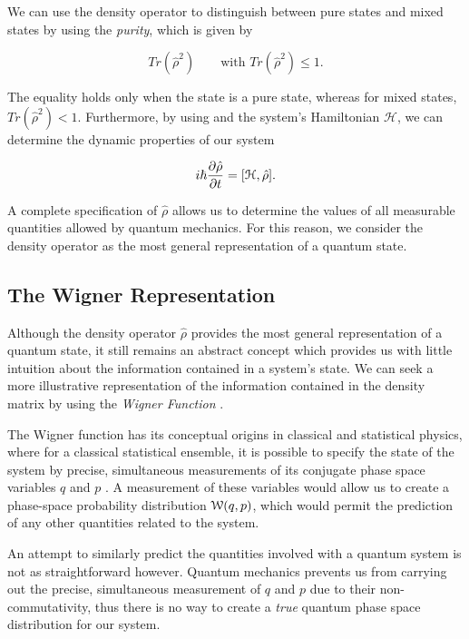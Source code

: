 \noindent
We can use the density operator to distinguish between pure states and mixed states by using the \emph{purity}, which is given by \cite{gerry2005introductory} 

\begin{equation}
  \label{eq:purity_density}
  Tr(\hat{\rho}^2) \quad \quad \text{with } Tr(\hat{\rho}^2) \le 1. 
\end{equation} 

\noindent
The equality holds only when the state is a pure state, whereas for mixed
states, $Tr(\hat{\rho}^2) < 1$.  Furthermore, by using  and the system's Hamiltonian $\mathcal{H}$, we can determine the dynamic properties of our system 

\begin{equation}
  \label{eq:von_neumann}
  i \hbar \frac{\partial \hat{\rho}}{\partial t} = [\mathcal{H}, \hat{\rho}].
\end{equation}

\noindent
A complete specification of $\hat{\rho}$ allows us to determine the values of all measurable quantities allowed by quantum mechanics.  For this reason, we consider the density operator as the most general representation of a quantum state.


\subsection{The Wigner Representation}
\label{the_wigner_representation} 


Although the density operator $\hat{\rho}$ provides the most general representation of a quantum state, it still remains an abstract concept which provides us with little intuition about the information contained in a system's state.  We can seek a more illustrative representation of the information contained in the density matrix by using the \emph{Wigner Function} \cite{Wigner32}.

The Wigner function has its conceptual origins in classical and statistical physics, where for a classical statistical ensemble, it is possible to specify the state of the system by precise, simultaneous measurements of its conjugate phase space variables $q$ and $p$ \cite{schleich2001quantum}.  A measurement of these variables would allow us to create a phase-space probability distribution $\mathcal{W}(q,p)$, which would permit the prediction of any other quantities related to the system. 

An attempt to similarly predict the quantities involved with a quantum system
is not as straightforward however.  Quantum mechanics prevents us from
carrying out the precise, simultaneous measurement of $q$ and $p$ due to their non-commutativity, thus there is no way to create a \emph{true} quantum phase space distribution for our system.

